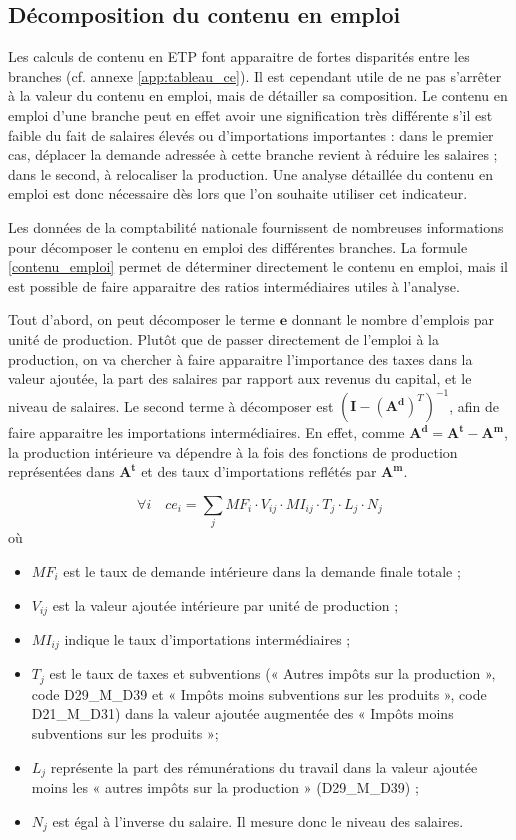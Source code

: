 \subsection{Décomposition du contenu en emploi}

Les calculs de contenu en ETP font apparaitre de fortes disparités entre les branches (cf. annexe \ref{app:tableau_ce}). Il est cependant utile de ne pas s’arrêter à la valeur du contenu en emploi, mais de détailler sa composition. Le contenu en emploi d’une branche peut en effet avoir une signification très différente s’il est faible du fait de salaires élevés ou d’importations importantes : dans le premier cas, déplacer la demande adressée à cette branche revient à réduire les salaires ; dans le second, à relocaliser la production. Une analyse détaillée du contenu en emploi est donc nécessaire dès lors que l’on souhaite utiliser cet indicateur.

Les données de la comptabilité nationale fournissent de nombreuses informations pour décomposer le contenu en emploi des différentes branches. La formule \ref{contenu_emploi} permet de déterminer directement le contenu en emploi, mais il est possible de faire apparaitre des ratios intermédiaires utiles à l'analyse.

Tout d'abord, on peut décomposer le terme $\pmb{e}$ donnant le nombre d'emplois par unité de production. Plutôt que de passer directement de l'emploi à la production, on va chercher à faire apparaitre l'importance des taxes dans la valeur ajoutée, la part des salaires par rapport aux revenus du capital, et le niveau de salaires.
Le second terme à décomposer est $(\pmb{I} - (\pmb{A^d})^T)^{-1}$, afin de faire apparaitre les importations intermédiaires. En effet, comme $\pmb{A^d} = \pmb{A^t} - \pmb{A^m}$, la production intérieure va dépendre à la fois des fonctions de production représentées dans $\pmb{A^t}$ et des taux d'importations reflétés par $\pmb{A^m}$.

\begin{equation}
\forall i \quad ce_i = \sum_j MF_i \cdot V_{ij} \cdot MI_{ij} \cdot T_j \cdot L_j \cdot N_j
\end{equation}
où
\begin{itemize}
	\item $MF_i $ est le taux de demande intérieure dans la demande finale totale ;
	\item $V_{ij}$ est la valeur ajoutée intérieure par unité de production ;
	\item $MI_{ij}$ indique le taux d'importations intermédiaires ;
	\item $T_j$ est le taux de taxes et subventions (« Autres impôts sur la production », code D29\_M\_D39 et « Impôts moins subventions sur les produits », code D21\_M\_D31) dans la valeur ajoutée augmentée des « Impôts moins subventions sur les produits »;
	\item $L_j$ représente la part des rémunérations du travail dans la valeur ajoutée moins les « autres impôts sur la production » (D29\_M\_D39) ;
	\item $N_j$ est égal à l’inverse du salaire. Il mesure donc le niveau des salaires.
\end{itemize}

